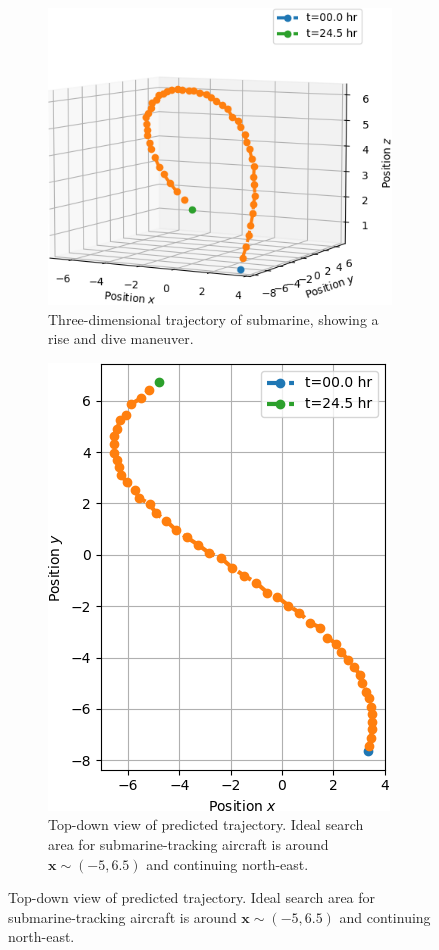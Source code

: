 \documentclass{article}
\begin{document}
\begin{figure}[hb]
  \centering
  \begin{subfigure}{0.42\textwidth}
    \centering
    \includegraphics[width=0.99\linewidth]{pics/3d_traj}
    \caption{Three-dimensional trajectory of submarine, showing a rise and dive maneuver.}\label{traj:3d}
  \end{subfigure}
  \begin{subfigure}{0.42\textwidth}
    \centering
    \includegraphics[width=0.68\linewidth]{pics/2d_traj}
    \caption{Top-down view of predicted trajectory. Ideal search area for submarine-tracking aircraft is around $\bm{x} \sim (-5, 6.5)$ and continuing north-east.}\label{traj:2d}
  \end{subfigure}
\end{figure}
\end{document}

